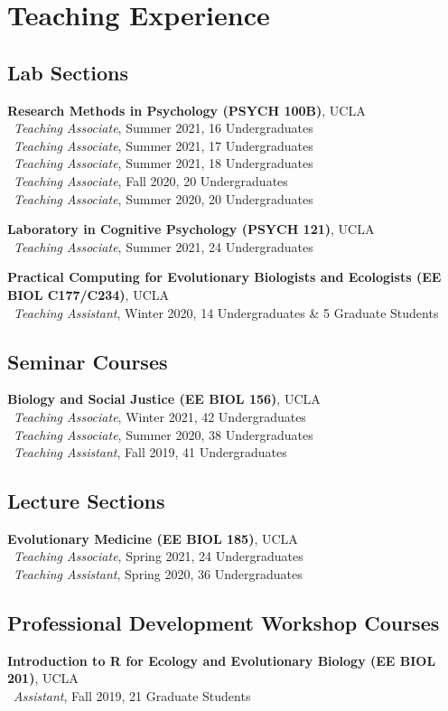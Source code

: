 \section*{Teaching Experience}
\subsection*{Lab Sections}
\textbf{Research Methods in Psychology (PSYCH 100B)}, UCLA\\
\textendash\ \textit{Teaching Associate}, Summer 2021, 16 Undergraduates\\
\textendash\ \textit{Teaching Associate}, Summer 2021, 17 Undergraduates\\
\textendash\ \textit{Teaching Associate}, Summer 2021, 18 Undergraduates\\
\textendash\ \textit{Teaching Associate}, Fall 2020, 20 Undergraduates\\
\textendash\ \textit{Teaching Associate}, Summer 2020, 20 Undergraduates

\pubspace

\textbf{Laboratory in Cognitive Psychology (PSYCH 121)}, UCLA\\
\textendash\ \textit{Teaching Associate}, Summer 2021, 24 Undergraduates

\pubspace

\textbf{Practical Computing for Evolutionary Biologists and Ecologists (EE BIOL C177/C234)}, UCLA\\
\textendash\ \textit{Teaching Assistant}, Winter 2020, 14 Undergraduates \& 5 Graduate Students

\subsection*{Seminar Courses}
\textbf{Biology and Social Justice (EE BIOL 156)}, UCLA\\
\textendash\ \textit{Teaching Associate}, Winter 2021, 42 Undergraduates\\
\textendash\ \textit{Teaching Associate}, Summer 2020, 38 Undergraduates\\
\textendash\ \textit{Teaching Assistant}, Fall 2019, 41 Undergraduates

\subsection*{Lecture Sections}
\textbf{Evolutionary Medicine (EE BIOL 185)}, UCLA\\
\textendash\ \textit{Teaching Associate}, Spring 2021, 24 Undergraduates\\
\textendash\ \textit{Teaching Assistant}, Spring 2020, 36 Undergraduates

\subsection*{Professional Development Workshop Courses}
\textbf{Introduction to R for Ecology and Evolutionary Biology (EE BIOL 201)}, UCLA\\
\textendash\ \textit{Assistant}, Fall 2019, 21 Graduate Students